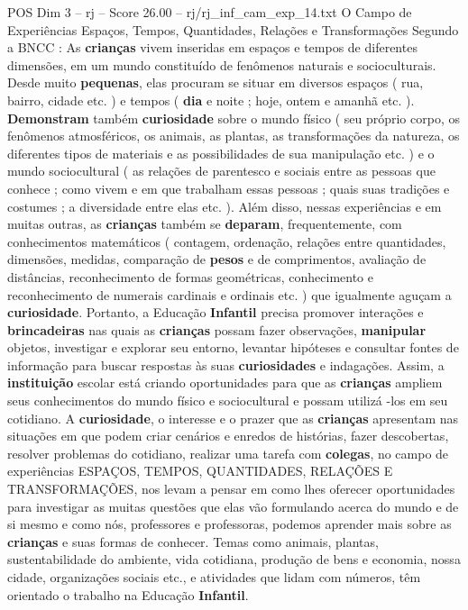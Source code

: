 \begin{textsample}{POS Dim 3 – rj – Score 26.00 – rj/rj\_inf\_cam\_exp\_14.txt}  \label{ex:f3_pos_004}
O Campo de Experiências Espaços, Tempos, Quantidades, Relações e Transformações Segundo a BNCC : As \textbf{crianças} vivem inseridas em espaços e tempos de diferentes dimensões, em um mundo constituído de fenômenos naturais e socioculturais.
Desde muito \textbf{pequenas}, elas procuram se situar em diversos espaços ( rua, bairro, cidade etc. ) e tempos ( \textbf{dia} e noite ; hoje, ontem e amanhã etc. ). \textbf{Demonstram} também \textbf{curiosidade} sobre o mundo físico ( seu próprio corpo, os fenômenos atmosféricos, os animais, as plantas, as transformações da natureza, os diferentes tipos de materiais e as possibilidades de sua manipulação etc. ) e o mundo sociocultural ( as relações de parentesco e sociais entre as pessoas que conhece ; como vivem e em que trabalham essas pessoas ; quais suas tradições e costumes ; a diversidade entre elas etc. ).
Além disso, nessas experiências e em muitas outras, as \textbf{crianças} também se \textbf{deparam}, frequentemente, com conhecimentos matemáticos ( contagem, ordenação, relações entre quantidades, dimensões, medidas, comparação de \textbf{pesos} e de comprimentos, avaliação de distâncias, reconhecimento de formas geométricas, conhecimento e reconhecimento de numerais cardinais e ordinais etc. ) que igualmente aguçam a \textbf{curiosidade}.
Portanto, a Educação \textbf{Infantil} precisa promover interações e \textbf{brincadeiras} nas quais as \textbf{crianças} possam fazer observações, \textbf{manipular} objetos, investigar e explorar seu entorno, levantar hipóteses e consultar fontes de informação para buscar respostas às suas \textbf{curiosidades} e indagações.
Assim, a \textbf{instituição} escolar está criando oportunidades para que as \textbf{crianças} ampliem seus conhecimentos do mundo físico e sociocultural e possam utilizá -los em seu cotidiano.
A \textbf{curiosidade}, o interesse e o prazer que as \textbf{crianças} apresentam nas situações em que podem criar cenários e enredos de histórias, fazer descobertas, resolver problemas do cotidiano, realizar uma tarefa com \textbf{colegas}, no campo de experiências ESPAÇOS, TEMPOS, QUANTIDADES, RELAÇÕES E TRANSFORMAÇÕES, nos levam a pensar em como lhes oferecer oportunidades para investigar as muitas questões que elas vão formulando acerca do mundo e de si mesmo e como nós, professores e professoras, podemos aprender mais sobre as \textbf{crianças} e suas formas de conhecer.
Temas como animais, plantas, sustentabilidade do ambiente, vida cotidiana, produção de bens e economia, nossa cidade, organizações sociais etc., e atividades que lidam com números, têm orientado o trabalho na Educação \textbf{Infantil}.

\end{textsample}
